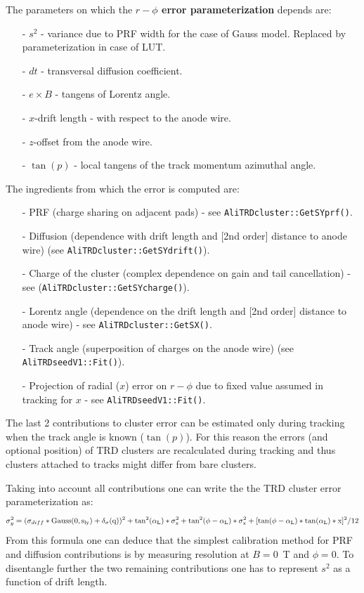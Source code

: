 \documentclass{alicetdr}
\begin{document}
The parameters on which the {\bf $r-\phi$ error parameterization} depends are:
\begin{itemize}
  \item[-] $s^2$  - variance due to PRF width for the case of Gauss model. Replaced 
           by parameterization in case of LUT.
  \item[-] $dt$  - transversal diffusion coefficient.
  \item[-] $e \times B$ - tangens of Lorentz angle.
  \item[-] $x$-drift length - with respect to the anode wire.
  \item[-] $z$-offset from the anode wire.
  \item[-] $\tan(p)$ - local tangens of the track momentum azimuthal angle.
\end{itemize}

The ingredients from which the error is computed are:
\begin{itemize}
  \item[-] PRF (charge sharing on adjacent pads)  - see {\tt AliTRDcluster::GetSYprf()}.
  \item[-] Diffusion (dependence with drift length and [2nd order] distance to anode wire) 
           (see {\tt AliTRDcluster::GetSYdrift()}).
  \item[-] Charge of the cluster (complex dependence on gain and tail cancellation) - see 
           ({\tt AliTRD\-cluster::GetSYcharge()}).
  \item[-] Lorentz angle (dependence on the drift length and [2nd order] distance to anode 
           wire) - see {\tt AliTRDcluster::GetSX()}.
  \item[-] Track angle (superposition of charges on the anode wire) 
           (see {\tt AliTRDseedV1::Fit()}).
  \item[-] Projection of radial ($x$) error on $r-\phi$ due to fixed value assumed in 
           tracking for $x$ - see {\tt AliTRDseedV1::Fit()}.
\end{itemize}

The last 2 contributions to cluster error can be estimated only during tracking 
when the track angle is known ($\tan(p)$). For this reason the errors (and 
optional position) of TRD clusters are recalculated during tracking and thus 
clusters attached to tracks might differ from bare clusters.

Taking into account all contributions one can write the the TRD cluster error 
parameterization as:
\begin{equation}\label{EQ_CLUSTER:error}
\sigma_{y}^{2} = (\sigma_{diff}*\rm{Gauss}(0, s_{ly}) + \delta_{\sigma}(q))^{2} 
               + \tan^{2}(\alpha_{L})*\sigma_{x}^{2} 
               + \tan^{2}(\phi-\alpha_{L})*\sigma_{x}^{2}
               + [\tan(\phi-\alpha_{L})*\tan(\alpha_{L})*x]^{2}/12
\end{equation}
From this formula one can deduce that the simplest calibration method for PRF and 
diffusion contributions is by measuring resolution at $B = 0$~T and $\phi = 0$. 
To disentangle further the two remaining contributions one has to represent $s^2$ 
as a function of drift length. 
\end{document}
